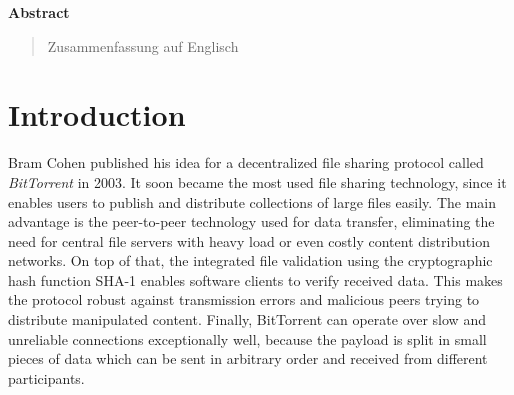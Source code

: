 \documentclass[10pt, a4paper, twoside, headsepline]{scrbook}
\renewcommand{\_}{\origunderscore\allowbreak}
\begin{document}
\vspace*{\fill}
\begin{center}
{\large\textbf{Abstract}}
\end{center}

\begin{quote}
Zusammenfassung auf Englisch
\end{quote}
\vspace*{\fill}

\tableofcontents

\listoffigures

\listoftables

\chapter{Introduction}
\pagestyle{headings}
Bram Cohen published \cite{cohen2003incentives} his idea for a decentralized file sharing protocol called \emph{BitTorrent} in 2003. It soon became the most used file sharing technology, since it enables users to publish and distribute collections of large files easily. The main advantage is the peer-to-peer technology used for data transfer, eliminating the need for central file servers with heavy load or even costly content distribution networks. On top of that, the integrated file validation using the cryptographic hash function SHA-1 enables software clients to verify received data. This makes the protocol robust against transmission errors and malicious peers trying to distribute manipulated content. Finally, BitTorrent can operate over slow and unreliable connections exceptionally well, because the payload is split in small pieces of data which can be sent in arbitrary order and received from different participants.
\end{document}
